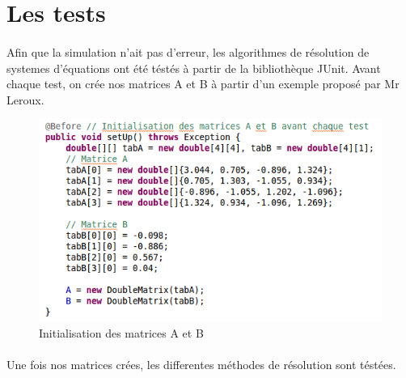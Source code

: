 \documentclass[a4paper,11pt]{article}
\begin{document}
		\paragraph{}

		\newpage

		\section{Les tests}
		\paragraph{}
		Afin que la simulation n'ait pas d'erreur, les algorithmes de résolution de systemes d'équations ont été téstés à partir de la bibliothèque JUnit.
		Avant chaque test, on crée nos matrices A et B à partir d'un exemple proposé par Mr Leroux.

		\begin{figure}[h]
			\centerline{\includegraphics[scale=0.50]{img/testInit.png}}
			\caption{Initialisation des matrices A et B}
			\label{diagramme-composants}
		\end{figure} 

		\paragraph{}
		Une fois nos matrices crées, les differentes méthodes de résolution sont téstées.
\end{document}
